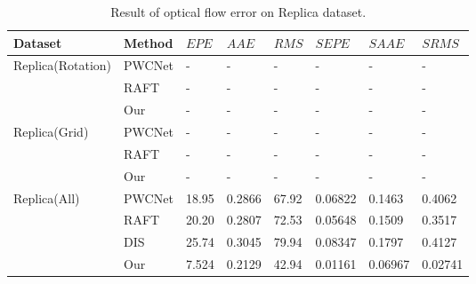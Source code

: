 \begin{table}[h!]
	\centering
	\caption{\label{fig:exp:oferrorquality}%
		Result of optical flow error on Replica dataset.}
	\begin{tabular}{p{2cm}p{1.2cm}p{1.2cm}p{1.2cm}p{1.2cm}p{1.2cm}p{1.2cm}p{1.2cm}}
		\hline
		 Dataset &  Method & ${EPE}$ & $AAE$ & $RMS$ & $SEPE$ & ${SAAE}$ & ${SRMS}$ \\
		\hline
		\multirow{3}{*}{Replica(Rotation)} & PWCNet & - & -  & - & - & -& - \\ 
		 & RAFT & - & -  & - & - & -& - \\ 
		 & Our & - & -  & - & - & -& - \\ 
		\hline
		\multirow{3}{*}{Replica(Grid)} & PWCNet & - & -  & - & - & -& - \\ 
		& RAFT & - & -  & - & - & -& - \\ 
		& Our & - & -  & - & - & -& - \\ 
		\hline
		\multirow{4}{*}{Replica(All)} 
		& PWCNet & 18.95 & 0.2866  & 67.92 & 0.06822 & 0.1463 & 0.4062 \\
		& RAFT & 20.20 & 0.2807  & 72.53  & 0.05648 & 0.1509  & 0.3517 \\
		& DIS  & 25.74  & 0.3045  & 79.94  & 0.08347 & 0.1797  & 0.4127 \\
		& Our  & 7.524  & 0.2129  &  42.94 & 0.01161 & 0.06967 & 0.02741 \\
		\hline
	\end{tabular}
\end{table}





